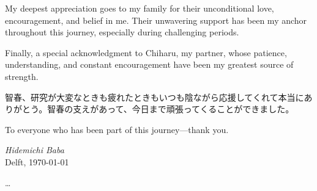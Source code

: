 My deepest appreciation goes to my family for their unconditional love, encouragement, and belief in me. Their unwavering support has been my anchor throughout this journey, especially during challenging periods.

Finally, a special acknowledgment to Chiharu, my partner, whose patience, understanding, and constant encouragement have been my greatest source of strength.
\begin{CJK}{UTF8}{min}
  智春、研究が大変なときも疲れたときもいつも陰ながら応援してくれて本当にありがとう。智春の支えがあって、今日まで頑張ってくることができました。
\end{CJK}

To everyone who has been part of this journey—thank you.

\vspace{1cm}

\begin{flushright}
  \textit{Hidemichi Baba}\\
  Delft, \today
\end{flushright}

\ldots
